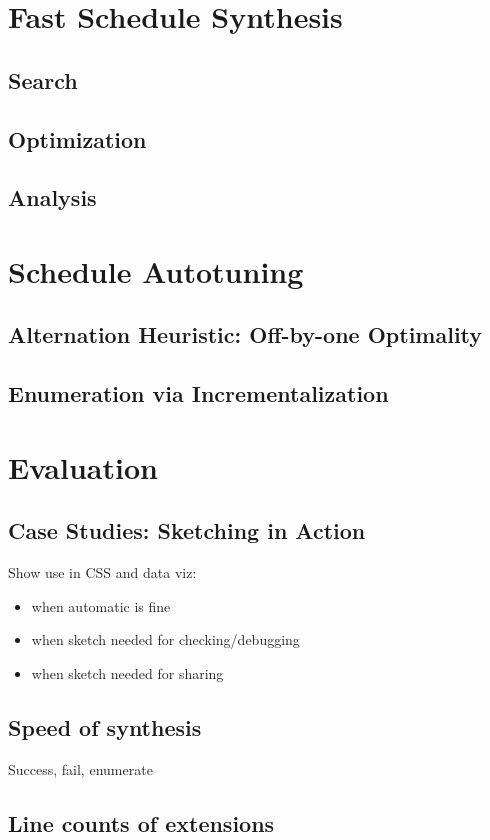 \section{Fast Schedule Synthesis}
\subsection{Search}
\subsection{Optimization}
\subsection{Analysis}

\section{Schedule Autotuning}
\label{sec:schedtuning}
\subsection{Alternation Heuristic: Off-by-one Optimality}
\subsection{Enumeration via Incrementalization}

\section{Evaluation}
\subsection{Case Studies: Sketching in Action}
Show use in CSS and data viz: 
\begin{itemize}
\item when automatic is fine
\item when sketch needed for checking/debugging
\item when sketch needed for sharing
\end{itemize}
\subsection{Speed of synthesis}
Success, fail, enumerate
\subsection{Line counts of extensions}
